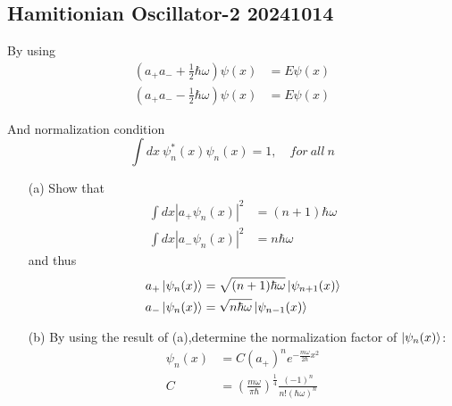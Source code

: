 \documentclass{article}
\begin{document}
\subsection{Hamitionian Oscillator-2 20241014}
By using 
\begin{align*}
    (a_{+}a_{-}+\frac{1}{2}\hbar\omega)\psi(x)&=E\psi(x)\\
    (a_{+}a_{-}-\frac{1}{2}\hbar\omega)\psi(x)&=E\psi(x)
\end{align*}

And normalization condition
\begin{equation*}
    \int dx\ \psi_n^{*}(x)\psi_n(x)=1,\quad for\ all\ n
\end{equation*}

\begin{enumerate}
    \item[(a)] Show that 
    \begin{align*}
        \int dx |a_{+}\psi_n(x)|^2&=(n+1)\hbar\omega\\
        \int dx |a_{-}\psi_n(x)|^2&=n\hbar\omega
    \end{align*}
    and thus 
    \begin{align*}
        a_{+}\ket{\psi_n(x)}&=\sqrt{(n+1)\hbar\omega}\ket{\psi_{n+1}(x)}\\
        a_{-}\ket{\psi_n(x)}&=\sqrt{n\hbar\omega}\ket{\psi_{n-1}(x)}
    \end{align*}
    \item[(b)] By using the result of (a),determine the normalization factor of $\ket{\psi_n(x)}$:
    \begin{align*}
        \psi_n(x)&=C(a_+)^ne^{-\frac{m\omega}{2\hbar}x^2}\\
        C&=\left(\frac{m\omega}{\pi\hbar}\right)^{\frac{1}{4}}\frac{(-1)^n}{n!(\hbar\omega)^n}
    \end{align*}
\end{enumerate}
\end{document}
